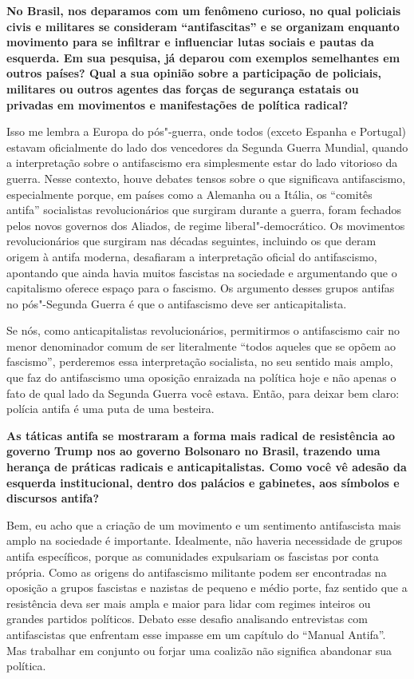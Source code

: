 \textbf{No Brasil, nos deparamos com um fenômeno curioso, no qual policiais civis e militares se consideram ``antifascitas'' e se organizam enquanto movimento para se infiltrar e influenciar lutas sociais e pautas da esquerda. Em sua pesquisa, já deparou com exemplos semelhantes em outros países? Qual a sua opinião sobre a participação de policiais, militares ou outros agentes das forças de segurança estatais ou privadas em movimentos e manifestações de política radical?}
 
Isso me lembra a Europa do pós"-guerra, onde todos (exceto Espanha e Portugal) estavam oficialmente do lado dos vencedores da Segunda Guerra Mundial, quando a interpretação sobre o antifascismo era simplesmente estar do lado vitorioso da guerra. Nesse contexto, houve debates tensos sobre o que significava antifascismo, especialmente porque, em países como a Alemanha ou a Itália, os ``comitês antifa'' socialistas revolucionários que surgiram durante a guerra, foram fechados pelos novos governos dos Aliados, de regime liberal"-democrático. Os movimentos revolucionários que surgiram nas décadas seguintes, incluindo os que deram origem à antifa moderna, desafiaram a interpretação oficial do antifascismo, apontando que ainda havia muitos fascistas na sociedade e argumentando que o capitalismo oferece espaço para o fascismo. Os argumento desses grupos antifas no pós"-Segunda Guerra é que o antifascismo deve ser anticapitalista. 
 
Se nós, como anticapitalistas revolucionários, permitirmos o antifascismo cair no menor denominador comum de ser literalmente ``todos aqueles que se opõem ao fascismo'', perderemos essa interpretação socialista, no seu sentido mais amplo, que faz do antifascismo uma oposição enraizada na política hoje e não apenas o fato de qual lado da Segunda Guerra você estava. Então, para deixar bem claro: polícia antifa é uma puta de uma besteira. 

\textbf{As táticas antifa se mostraram a forma mais radical de resistência ao governo Trump nos  ao governo Bolsonaro no Brasil, trazendo uma herança de práticas radicais e anticapitalistas. Como você vê adesão da esquerda institucional, dentro dos palácios e gabinetes, aos símbolos e discursos antifa?}
 
Bem, eu acho que a criação de um movimento e um sentimento antifascista mais amplo na sociedade é importante. Idealmente, não haveria necessidade de grupos antifa específicos, porque as comunidades expulsariam os fascistas por conta própria. Como as origens do antifascismo militante podem ser encontradas na oposição a grupos fascistas e nazistas de pequeno e médio porte, faz sentido que a resistência deva ser mais ampla e maior para lidar com regimes inteiros ou grandes partidos políticos. Debato esse desafio analisando entrevistas com antifascistas que enfrentam esse impasse em um capítulo do ``Manual Antifa''. Mas trabalhar em conjunto ou forjar uma coalizão não significa abandonar sua política. 
 
